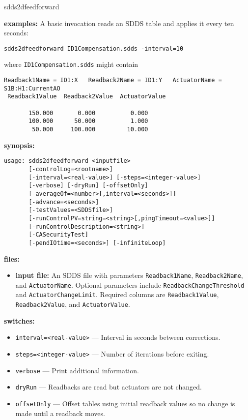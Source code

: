 \begin{sddsprog}{sdds2dfeedforward}
\item \textbf{examples:}
A basic invocation reads an SDDS table and applies it every ten seconds:
\begin{verbatim}
sdds2dfeedforward ID1Compensation.sdds -interval=10
\end{verbatim}
where \verb+ID1Compensation.sdds+ might contain
\begin{verbatim}
Readback1Name = ID1:X   Readback2Name = ID1:Y   ActuatorName = S1B:H1:CurrentAO
 Readback1Value  Readback2Value  ActuatorValue
------------------------------
       150.000       0.000          0.000
       100.000      50.000          1.000
        50.000     100.000         10.000
\end{verbatim}
\item \textbf{synopsis:}
\begin{verbatim}
usage: sdds2dfeedforward <inputfile>
       [-controlLog=<rootname>]
       [-interval=<real-value>] [-steps=<integer-value>]
       [-verbose] [-dryRun] [-offsetOnly]
       [-averageOf=<number>[,interval=<seconds>]]
       [-advance=<seconds>]
       [-testValues=<SDDSfile>]
       [-runControlPV=string=<string>[,pingTimeout=<value>]]
       [-runControlDescription=<string>]
       [-CASecurityTest]
       [-pendIOtime=<seconds>] [-infiniteLoop]
\end{verbatim}
\item \textbf{files:}
\begin{itemize}
  \item \textbf{input file:} An SDDS file with parameters \verb+Readback1Name+,
  \verb+Readback2Name+, and \verb+ActuatorName+.  Optional parameters include
  \verb+ReadbackChangeThreshold+ and \verb+ActuatorChangeLimit+.  Required
  columns are \verb+Readback1Value+, \verb+Readback2Value+, and
  \verb+ActuatorValue+.
\end{itemize}
\item \textbf{switches:}
\begin{itemize}
  \item {\tt interval=<real-value>} --- Interval in seconds between corrections.
  \item {\tt steps=<integer-value>} --- Number of iterations before exiting.
  \item {\tt verbose} --- Print additional information.
  \item {\tt dryRun} --- Readbacks are read but actuators are not changed.
  \item {\tt offsetOnly} --- Offset tables using initial readback values so
               no change is made until a readback moves.

\end{itemize}
\end{sddsprog}
